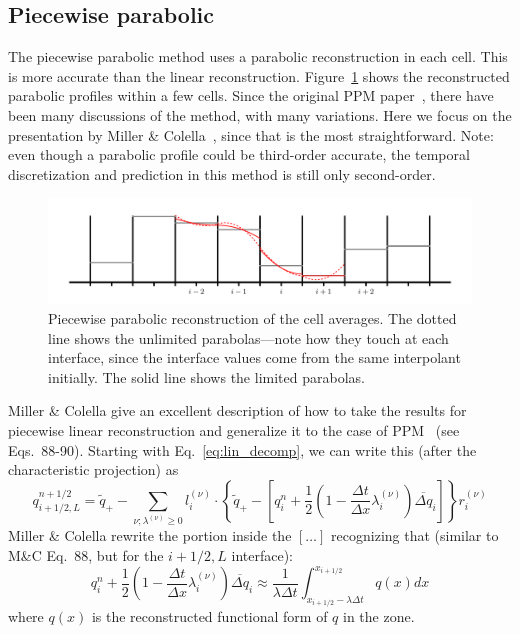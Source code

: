 \documentclass[11pt]{article}
\begin{document}
\subsection{Piecewise parabolic}

The piecewise parabolic method uses a parabolic reconstruction in each
cell.  This is more accurate than the linear reconstruction.
Figure~\ref{fig:ppm} shows the reconstructed parabolic profiles within
a few cells.  Since the original PPM
paper~\cite{colellawoodward:1984}, there have been many discussions of
the method, with many variations.  Here we focus on the presentation
by Miller \& Colella~\cite{millercolella:2002}, since that is the most
straightforward.  Note: even though a parabolic profile could be
third-order accurate, the temporal discretization and prediction in
this method is still only second-order.
%
\begin{figure}[t]
\centering
\includegraphics[width=6.5in]{piecewise-parabolic}
\caption{\label{fig:ppm} Piecewise parabolic reconstruction of the
cell averages.  The dotted line shows the unlimited parabolas---note
how they touch at each interface, since the interface values come from
the same interpolant initially.  The solid line shows the limited
parabolas.}
\end{figure}


Miller \& Colella give an excellent description of how to take the
results for piecewise linear reconstruction and generalize it to the case of
PPM~\cite{colellawoodward:1984} (see Eqs.\ 88-90).  Starting with
Eq.~\ref{eq:lin_decomp}, we can write this (after the characteristic
projection) as
\begin{equation}
q_{i+1/2,L}^{n+1/2} = \tilde{q}_+ -
   \sum_{\nu;\lambda^{(\nu)}\ge 0} l_i^{(\nu)} \cdot \left \{
        \tilde{q}_+ - \left [ q_i^n +
            \frac{1}{2} \left ( 1 - \frac{\Delta t}{\Delta x} \lambda_i^{(\nu)} \right ) \overline{\Delta q}_i \right ]
       \right \} r_i^{(\nu)}
\end{equation}
Miller \& Colella rewrite the portion inside the $[\ldots]$
recognizing that (similar to M\&C Eq.\ 88, but for the $i+1/2,L$ interface):
\begin{equation}
  q_i^n + \frac{1}{2} \left (1 - \frac{\Delta t}{\Delta x} \lambda_i^{(\nu)} \right ) \overline{\Delta q}_i 
  \approx \frac{1}{\lambda \Delta t} \int_{x_{i+1/2} - \lambda \Delta t}^{x_{i+1/2}}
           q(x) dx
\end{equation}
where $q(x)$ is the reconstructed functional form of $q$ in the zone.
\end{document}
